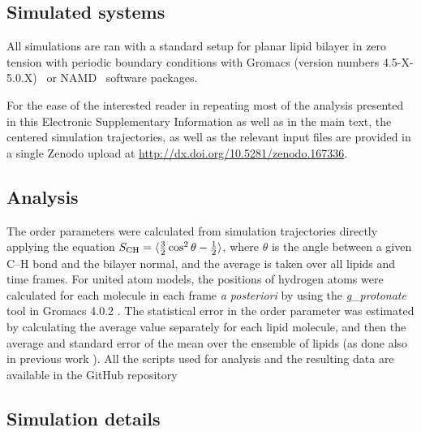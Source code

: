 \documentclass[twoside,twocolumn,9pt]{article}
\begin{document}
\subsection{Simulated systems}
All simulations are ran with a standard setup for planar lipid bilayer in zero tension
with periodic boundary conditions with Gromacs (version numbers 4.5-X-5.0.X)~\cite{pronk13,abraham15} 
or NAMD~\cite{NAMD} software packages.

For the ease of the interested reader in repeating most of the analysis
presented in this Electronic Supplementary Information as well as in the
main text, the centered simulation trajectories, as well as the relevant input
files are provided in a single Zenodo upload at
\url{http://dx.doi.org/10.5281/zenodo.167336}.

\subsection{Analysis}
The order parameters were calculated from simulation trajectories directly applying the equation
$S_{{\rm CH}}=\langle \frac{3}{2}  \cos^2 \theta-\frac{1}{2} \rangle$,
where $\theta$ is the angle between a given C--H bond and the bilayer normal, and the average is taken
over all lipids and time frames. For united atom models, the positions of hydrogen atoms
were calculated for each molecule in each frame \textit{a posteriori} by using the {\it g\_protonate} tool in 
Gromacs 4.0.2 \cite{gromacsMANUAL402}. 
The statistical error in the order parameter was estimated by calculating the average value separately for each lipid molecule,
and then the average and standard error of the mean over the ensemble of lipids (as done also in previous work \cite{botan15}).
All the scripts used for analysis and the resulting data are available in the GitHub repository \cite{githubIONpaper}

\subsection{Simulation details}
\end{document}
